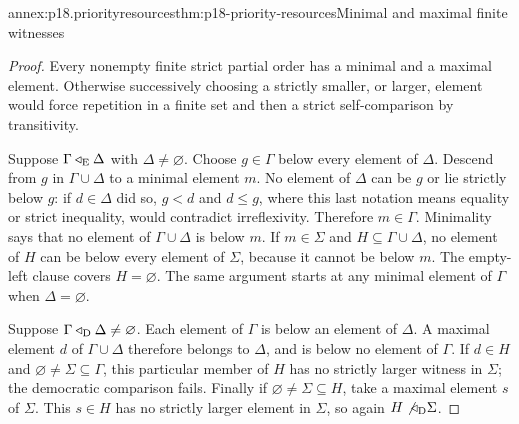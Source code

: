 \begin{annexitem}{annex:p18.priorityresources}{thm:p18-priority-resources}{Minimal and maximal finite witnesses}
\begin{proof}
Every nonempty finite strict partial order has a minimal and a maximal
element. Otherwise successively choosing a strictly smaller, or larger,
element would force repetition in a finite set and then a strict
self-comparison by transitivity.

Suppose \(\Gamma\triangleleft_{\rm E}\Delta\) with \(\Delta\ne\varnothing\).
Choose \(g\in\Gamma\) below every element of \(\Delta\).
Descend from \(g\) in \(\Gamma\cup\Delta\) to a minimal element \(m\).
No element of \(\Delta\) can be \(g\) or lie strictly below \(g\):
if \(d\in\Delta\) did so, \(g<d\) and \(d\leq g\), where this last
notation means equality or strict inequality, would contradict
irreflexivity. Therefore \(m\in\Gamma\).
Minimality says that no element of \(\Gamma\cup\Delta\) is below \(m\).
If \(m\in\Sigma\) and \(H\subseteq\Gamma\cup\Delta\), no element
of \(H\) can be below every element of \(\Sigma\), because it cannot
be below \(m\). The empty-left clause covers \(H=\varnothing\).
The same argument starts at any minimal element of \(\Gamma\) when
\(\Delta=\varnothing\).

Suppose \(\Gamma\triangleleft_{\rm D}\Delta\ne\varnothing\).
Each element of \(\Gamma\) is below an element of \(\Delta\).
A maximal element \(d\) of \(\Gamma\cup\Delta\) therefore belongs
to \(\Delta\), and is below no element of \(\Gamma\).
If \(d\in H\) and \(\varnothing\ne\Sigma\subseteq\Gamma\), this
particular member of \(H\) has no strictly larger witness in \(\Sigma\);
the democratic comparison fails.
Finally if \(\varnothing\ne\Sigma\subseteq H\), take a maximal
element \(s\) of \(\Sigma\). This \(s\in H\) has no strictly larger
element in \(\Sigma\), so again \(H\not\triangleleft_{\rm D}\Sigma\).
\end{proof}
\end{annexitem}

